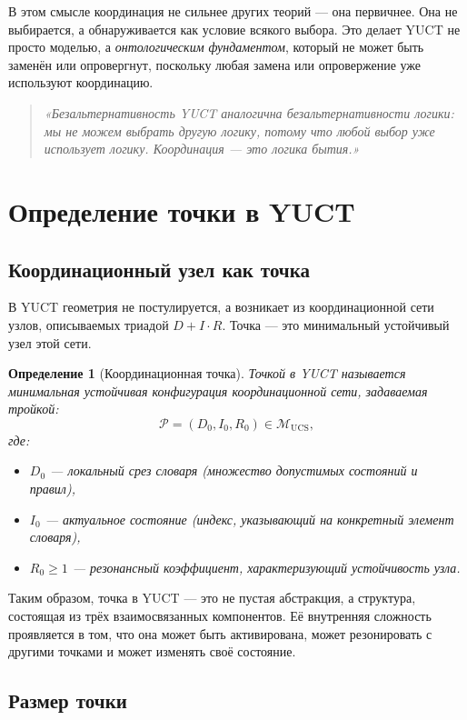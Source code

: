 \documentclass[12pt,a4paper]{article}
\newtheorem{definition}{Определение}
\newcommand{\calP}{\mathcal{P}}
\begin{document}
	В этом смысле координация не сильнее других теорий — она первичнее. Она не выбирается, а обнаруживается как условие всякого выбора. Это делает YUCT не просто моделью, а \emph{онтологическим фундаментом}, который не может быть заменён или опровергнут, поскольку любая замена или опровержение уже используют координацию.
	
	\begin{quote}
		\itshape
		«Безальтернативность YUCT аналогична безальтернативности логики: мы не можем выбрать другую логику, потому что любой выбор уже использует логику. Координация — это логика бытия.»
	\end{quote}
	
	\section{Определение точки в YUCT}
	
	\subsection{Координационный узел как точка}
	
	В YUCT геометрия не постулируется, а возникает из координационной сети узлов, описываемых триадой \(D+I\cdot R\). Точка — это минимальный устойчивый узел этой сети.
	
	\begin{definition}[Координационная точка]
		Точкой в YUCT называется минимальная устойчивая конфигурация координационной сети, задаваемая тройкой:
		\[
		\calP = (D_0, I_0, R_0) \in \mathcal{M}_{\mathrm{UCS}},
		\]
		где:
		\begin{itemize}
			\item \(D_0\) — локальный срез словаря (множество допустимых состояний и правил),
			\item \(I_0\) — актуальное состояние (индекс, указывающий на конкретный элемент словаря),
			\item \(R_0 \ge 1\) — резонансный коэффициент, характеризующий устойчивость узла.
		\end{itemize}
	\end{definition}
	
	Таким образом, точка в YUCT — это не пустая абстракция, а структура, состоящая из трёх взаимосвязанных компонентов. Её внутренняя сложность проявляется в том, что она может быть активирована, может резонировать с другими точками и может изменять своё состояние.
	
	\subsection{Размер точки}
	
\end{document}
